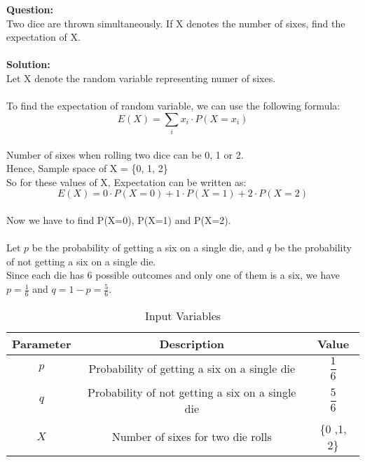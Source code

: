 \documentclass[journal,12pt,twocolumn]{IEEEtran}
\begin{document}
\maketitle
\newpage

\renewcommand{\thefigure}{\theenumi}
\renewcommand{\thetable}{\theenumi}

\noindent\textbf{Question:}\\

Two dice are thrown simultaneously. If X denotes the number of sixes, find the expectation of X.
\\ \\
\noindent\textbf{Solution:}\\


Let X denote the random variable representing numer of sixes.
\\ \\
To find the expectation of random variable, we can use the following formula:
\\
\[ E(X) = \sum_{i} x_i \cdot P(X = x_i) \]
\\
Number of sixes when rolling two dice can be 0, 1 or 2.
\\
\noindent Hence, Sample space of X = \{0, 1, 2\} \\
So for these values of X, Expectation can be written as:
\[ E(X) = 0 \cdot P(X=0) + 1 \cdot P(X=1) + 2 \cdot P(X=2)\]
\\
Now we have to find P(X=0), P(X=1) and P(X=2).
\\ \\
\noindent Let $p$ be the probability of getting a six on a single die, and $q$ be the probability of not getting a six on a single die.
\\
\noindent Since each die has 6 possible outcomes and only one of them is a six, we have $p = \frac{1}{6}$ and $q = 1 - p = \frac{5}{6}$.

\begin{table}[ht]
\begin{center}
\begin{tabular}{|c|c|c|}
\hline
Parameter & Description & Value \\
\hline
$p$ & Probability of getting a six on a single die & $\dfrac{1}{6}$ \\
$q$ & Probability of not getting a six on a single die & $\dfrac{5}{6}$ \\
$X$ & Number of sixes for two die rolls & \{0 ,1, 2\} \\
\hline
\end{tabular}
\caption*{\label{table 1}Input Variables}
\end{center}
\end{table}
\end{document}

